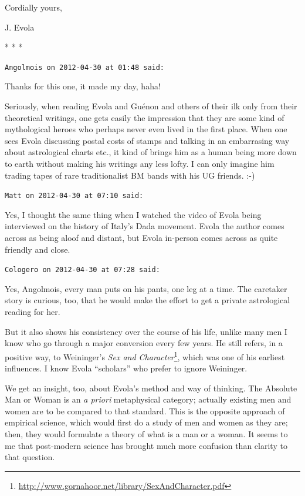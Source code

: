 Cordially yours,

J. Evola



\begin{center}* * *\end{center}

\begin{footnotesize}
\begin{sffamily}
\texttt{Angolmois on 2012-04-30 at 01:48 said:}

Thanks for this one, it made my day, haha!

Seriously, when reading Evola and Guénon and others of their ilk only from their theoretical writings, one gets easily the impression that they are some kind of mythological heroes who perhaps never even lived in the first place. When one sees Evola discussing postal costs of stamps and talking in an embarrasing way about astrological charts etc., it kind of brings him as a human being more down to earth without making his writings any less lofty. I can only imagine him trading tapes of rare traditionalist BM bands with his UG friends. :-)

\hfill

\texttt{Matt on 2012-04-30 at 07:10 said:}

Yes, I thought the same thing when I watched the video of Evola being interviewed on the history of Italy's Dada movement. Evola the author comes across as being aloof and distant, but Evola in-person comes across as quite friendly and close.

\hfill

\texttt{Cologero on 2012-04-30 at 07:28 said:}

Yes, Angolmois, every man puts on his pants, one leg at a time. The caretaker story is curious, too, that he would make the effort to get a private astrological reading for her.

But it also shows his consistency over the course of his life, unlike many men I know who go through a major conversion every few years. He still refers, in a positive way, to Weininger's \textit{Sex and Character}\footnote{\url{http://www.gornahoor.net/library/SexAndCharacter.pdf}}, which was one of his earliest influences. I know Evola ``scholars'' who prefer to ignore Weininger.

We get an insight, too, about Evola's method and way of thinking. The Absolute Man or Woman is an \emph{a priori} metaphysical category; actually existing men and women are to be compared to that standard. This is the opposite approach of empirical science, which would first do a study of men and women as they are; then, they would formulate a theory of what is a man or a woman. It seems to me that post-modern science has brought much more confusion than clarity to that question.


\end{sffamily}
\end{footnotesize}
